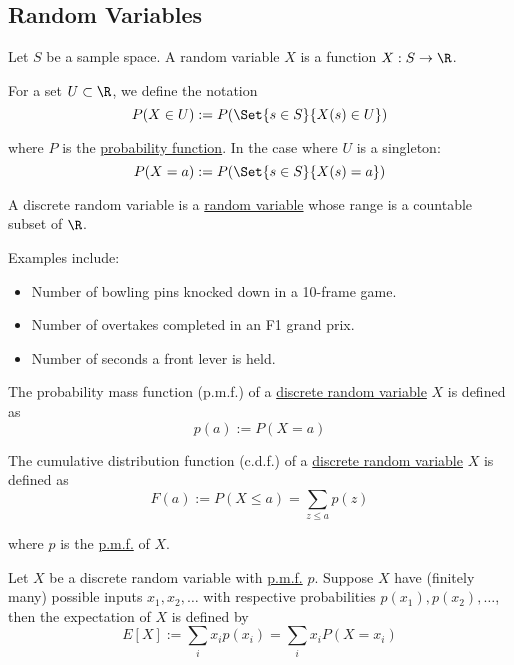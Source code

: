 \subsection{Random Variables}\label{bde41e4}

\label{b96960b}

Let $S$ be a sample space. A random variable $X$ is a function $X:S\to\R$.

For a set $U\subset\R$, we define the notation
$$
  P(X\in U):=P(\Set{s\in S}{X(s)\in U})
$$

where $P$ is the \href{fa898fb}{probability function}. In the case where $U$ is
a singleton:
$$
  P(X=a):=P(\Set{s\in S}{X(s)=a})
$$

\label{f831030}

A discrete random variable is a \href{b96960b}{random variable} whose range is
a countable subset of $\R$.

Examples include:
\begin{itemize}
  \item Number of bowling pins knocked down in a 10-frame game.
  \item Number of overtakes completed in an F1 grand prix.
  \item Number of seconds a front lever is held.
\end{itemize}

\label{bcef5f1}

The probability mass function (p.m.f.) of a \href{f831030}{discrete random
variable} $X$ is defined as
$$
  p(a):=P(X=a)
$$

\label{f05a29d}

The cumulative distribution function (c.d.f.) of a \href{f831030}{discrete
random variable} $X$ is defined as
$$
  F(a):=P(X\leq a)=\sum_{z\leq a}p(z)
$$

where $p$ is the \href{bcef5f1}{p.m.f.} of $X$.

\label{ecb2162}

Let $X$ be a discrete random variable with \href{bcef5f1}{p.m.f.} $p$. Suppose
$X$ have (finitely many) possible inputs $x_1,x_2,\ldots$ with respective
probabilities $p(x_1),p(x_2),\ldots$, then the expectation of $X$ is defined by
$$
  E[X]:=\sum_{i}x_ip(x_i)=\sum_{i}x_iP(X=x_i)
$$

\label{a2ccee7}

